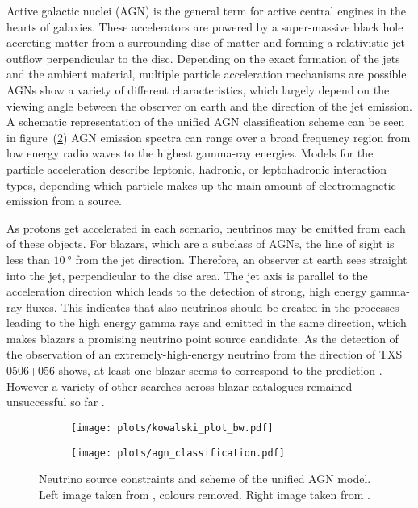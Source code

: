 Active galactic nuclei (AGN) is the general term for active central engines in the hearts of galaxies.
These accelerators are powered by a super-massive black hole accreting matter from a surrounding disc of matter and forming a relativistic jet outflow perpendicular to the disc.
Depending on the exact formation of the jets and the ambient material, multiple particle acceleration mechanisms are possible.
AGNs show a variety of different characteristics, which largely depend on the viewing angle between the observer on earth and the direction of the jet emission.
A schematic representation of the unified AGN classification scheme can be seen in figure~(\ref{fig:astro_agns})
AGN emission spectra can range over a broad frequency region from low energy radio waves to the highest gamma-ray energies.
Models for the particle acceleration describe leptonic, hadronic, or leptohadronic interaction types, depending which particle makes up the main amount of electromagnetic emission from a source.

As protons get accelerated in each scenario, neutrinos may be emitted from each of these objects.
For blazars, which are a subclass of AGNs, the line of sight is less than $\SI{10}{\degree}$ from the jet direction.
Therefore, an observer at earth sees straight into the jet, perpendicular to the disc area.
The jet axis is parallel to the acceleration direction which leads to the detection of strong, high energy gamma-ray fluxes.
This indicates that also neutrinos should be created in the processes leading to the high energy gamma rays and emitted in the same direction, which makes blazars a promising neutrino point source candidate.
As the detection of the observation of an extremely-high-energy neutrino from the direction of TXS 0506+056 shows, at least one blazar seems to correspond to the prediction \cite{Keivani:2018rnh,Gao:2018mnu}.
However a variety of other searches across blazar catalogues remained unsuccessful so far \cite{Meagher:2017omt,Huber:2017wxt}.

\begin{figure}[htbp]
  \centering
  \begin{subfigure}[t]{0.49\textwidth}
    \centering
    \texttt{[image: plots/kowalski\_plot\_bw.pdf]}
    \label{fig:astro_kowalski_plot}
  \end{subfigure}
  \hfill
  \begin{subfigure}[t]{0.49\textwidth}
    \centering
    \texttt{[image: plots/agn\_classification.pdf]}
    \label{fig:astro_agns}
  \end{subfigure}
  \caption[Neutrino source constraints and unified AGN model.]{Neutrino source constraints and scheme of the unified AGN model. Left image taken from \cite{Kowalski:2014zda}, colours removed. Right image taken from \cite{Beckmann:2013wte}.}
  \label{fig:agns_and_kowalski}
\end{figure}



